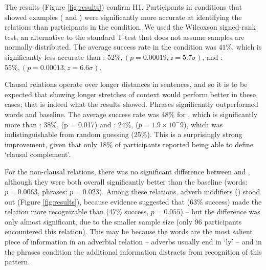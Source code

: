 The results (Figure \ref{fig:results}) confirm H1. Participants in conditions that showed examples ( and ) were significantly more accurate at identifying the relations than participants in the  condition. We used the Wilcoxson signed-rank test, an alternative to the standard T-test that does not assume samples are normally distributed. The average success rate in the  condition was $41\%$, which is significantly less accurate than : $52\%, (p = 0.00019, z =5.7\sigma)$, and : $55\%, (p = 0.00013, z=6.6\sigma)$.


Clausal relations operate over longer distances in sentences, and so it is to be expected that showing longer stretches of context would perform better in these cases; that is indeed what the results showed.
Phrases significantly outperformed words and baseline. The average success rate was 48\% for , which is significantly more than : 38\%, (p = 0.017) and : 24\%, ($p= 1.9 \times 10^-9$), which was indistinguishable from random guessing (25\%). This is a surprisingly strong improvement, given that only 18\% of participants reported being able to define  `clausal complement'.

For the non-clausal relations, there was no significant difference between  and , although they were both overall significantly better than the baseline (words: $p=0.0063$, phrases: $p=0.023$). Among these relations, adverb modifiers () stood out (Figure \ref{fig:results}), because evidence suggested that  (63\% success) made the relation more recognizable than  (47\% success, $p = 0.055$) -- but the difference was only almost significant, due to the smaller sample size (only 96 participants encountered this relation). This may be because the words are the most salient piece of information in an adverbial relation -- adverbs usually end in `ly' -- and in the phrases condition the additional information distracts from recognition of this pattern.

